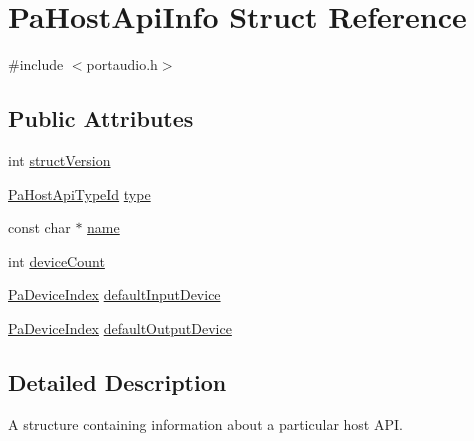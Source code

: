 \hypertarget{struct_pa_host_api_info}{\section{Pa\+Host\+Api\+Info Struct Reference}
\label{struct_pa_host_api_info}
}


{\ttfamily \#include $<$portaudio.\+h$>$}

\subsection*{Public Attributes}
\begin{DoxyCompactItemize}
\item 
int \hyperlink{struct_pa_host_api_info_a1f3a8c465488e7af8024237256d80c14}{struct\+Version}
\item 
\hyperlink{portaudio_8h_a8eaebe3d39c5ea45598da8f86dc2e5ae}{Pa\+Host\+Api\+Type\+Id} \hyperlink{struct_pa_host_api_info_a5424bfcdf9f73b17cddc89e827a45d3f}{type}
\item 
const char $\ast$ \hyperlink{struct_pa_host_api_info_a78afe5d557543c82cd9773229e25a8ec}{name}
\item 
int \hyperlink{struct_pa_host_api_info_a44e3adfaba0117a6780e2493468c96b1}{device\+Count}
\item 
\hyperlink{portaudio_8h_ad79317e65bde63d76c4b8e711ac5a361}{Pa\+Device\+Index} \hyperlink{struct_pa_host_api_info_a85a62057c3479d3efaa477d8562cf21d}{default\+Input\+Device}
\item 
\hyperlink{portaudio_8h_ad79317e65bde63d76c4b8e711ac5a361}{Pa\+Device\+Index} \hyperlink{struct_pa_host_api_info_a62632690b5f7906d3c9bfdab91e7f4b2}{default\+Output\+Device}
\end{DoxyCompactItemize}


\subsection{Detailed Description}
A structure containing information about a particular host A\+P\+I. 

